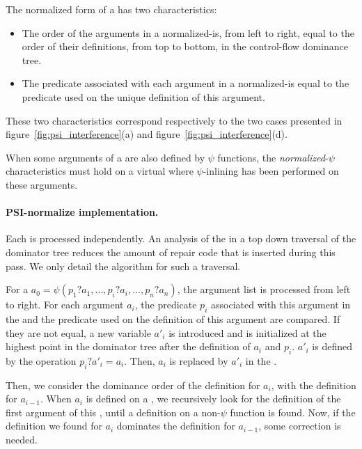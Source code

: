 The normalized form of a \psifun has two characteristics:

\begin{itemize}
\item The order of the arguments in a normalized-\psifun is,
from left to right, equal to the order of their definitions, from top
to bottom, in the control-flow dominance tree.
\item The predicate associated with each argument in a
normalized-\psifun is equal to the predicate used on the
unique definition of this argument.
\end{itemize}

These two characteristics correspond respectively to the two cases
presented in figure~\ref{fig:psi_interference}(a) and
figure~\ref{fig:psi_interference}(d).

When some arguments of a \psifun are also defined by $\psi$
functions, the {\em normalized}-$\psi$ characteristics must hold on a
virtual \psifun where $\psi$-inlining has been performed on
these arguments.

\paragraph{PSI-normalize implementation.}

Each \psifun is processed independently. An analysis of the
\psifuns in a top down traversal of the dominator tree
reduces the amount of repair code that is inserted during this pass. We
only detail the algorithm for such a traversal.

For a \psifun ${a_0 = \psi(p_1?a_1, ..., p_i?a_i, ...,
  p_n?a_n)}$, the argument list is processed from left to right. For
each argument ${a_i}$, the predicate ${p_i}$ associated with this argument
in the \psifun and the predicate used on the definition of
this argument are compared. If they are not equal, a new variable
${a'_i}$ is introduced and is initialized at the highest point in the
dominator tree after the definition of ${a_i}$ and ${p_i}$. ${a'_i}$ is
defined by the operation ${p_i? a'_i = a_i}$. Then, ${a_i}$ is
replaced by ${a'_i}$ in the \psifun.

Then, we consider the dominance order of the definition for ${a_i}$,
with the definition for ${a_{i-1}}$. When ${a_i}$ is defined on a
\psifun, we recursively look for the definition of the first
argument of this \psifun, until a definition on a non-$\psi$
function is found. Now, if the definition we found for ${a_i}$
dominates the definition for ${a_{i-1}}$, some correction is needed.

